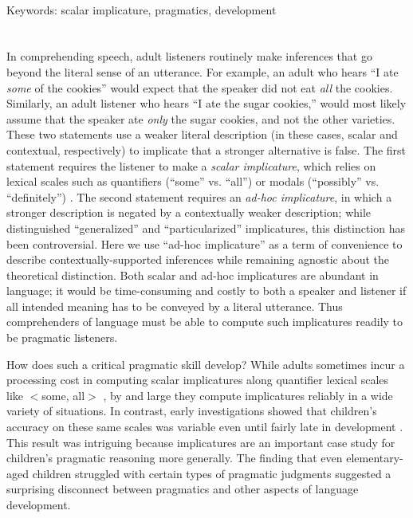 \documentclass[man]{apa2}
\begin{document}
~\\

\noindent
Keywords: scalar implicature, pragmatics, development

%
%

\newpage

\section{}

In comprehending speech, adult listeners routinely make inferences that go beyond the literal sense of an utterance. For example, an adult who hears ``I ate \emph{some} of the cookies'' would expect that the speaker did not eat \emph{all} the cookies. Similarly, an adult listener who hears ``I ate the sugar cookies,'' would most likely assume that the speaker ate \emph{only} the sugar cookies, and not the other varieties. These two statements use a weaker literal description (in these cases, scalar and contextual, respectively) to implicate that a stronger alternative is false. The first statement requires the listener to make a \emph{scalar implicature}, which relies on lexical scales such as quantifiers (``some'' vs. ``all'') or modals (``possibly'' vs. ``definitely'') . The second statement requires an \emph{ad-hoc implicature}, in which a stronger description is negated by a contextually weaker description; while  distinguished ``generalized'' and ``particularized'' implicatures, this distinction has been controversial. Here we use ``ad-hoc implicature'' as a term of convenience to describe contextually-supported inferences while remaining agnostic about the theoretical distinction. Both scalar and ad-hoc implicatures are abundant in language; it would be time-consuming and costly to both a speaker and listener if all intended meaning has to be conveyed by a literal utterance. Thus comprehenders of language must be able to compute such implicatures readily to be pragmatic listeners.

How does such a critical pragmatic skill develop? While adults sometimes incur a processing cost in computing scalar implicatures along quantifier lexical scales like  $<${\sc some, all}$>$ , by and large they compute implicatures reliably in a wide variety of situations. In contrast, early investigations showed that children's accuracy on these same scales was variable even until fairly late in development . This result was intriguing because implicatures are an important case study for children's pragmatic reasoning more generally. The finding that even elementary-aged children struggled with certain types of pragmatic judgments suggested a surprising disconnect between pragmatics and other aspects of language development.
\end{document}
